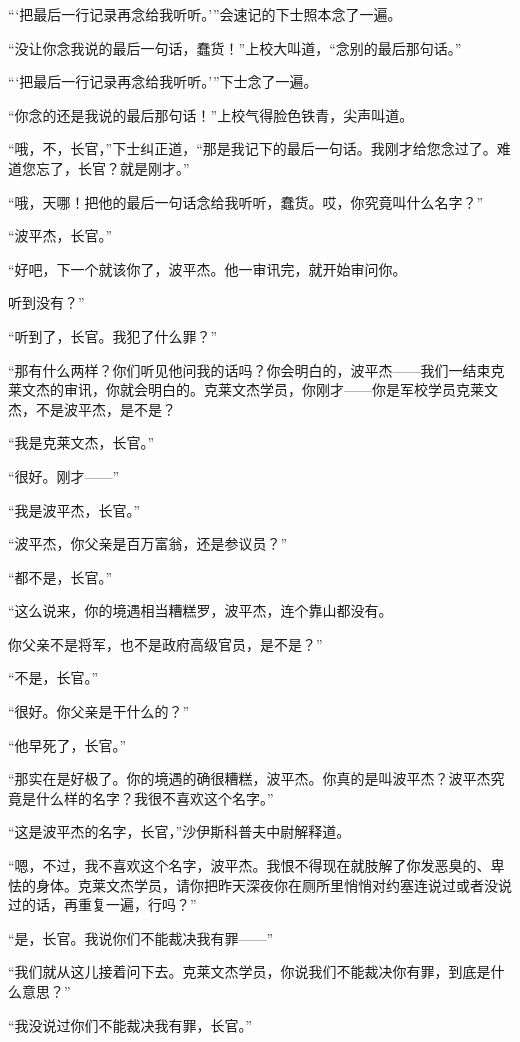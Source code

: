     “‘把最后一行记录再念给我听听。’”会速记的下士照本念了一遍。

    “没让你念我说的最后一句话，蠢货！”上校大叫道，“念别的最后那句话。”

    “‘把最后一行记录再念给我听听。’”下士念了一遍。

    “你念的还是我说的最后那句话！”上校气得脸色铁青，尖声叫道。

    “哦，不，长官，”下士纠正道，“那是我记下的最后一句话。我刚才给您念过了。难道您忘了，长官？就是刚才。”

    “哦，天哪！把他的最后一句话念给我听听，蠢货。哎，你究竟叫什么名字？”

    “波平杰，长官。”

    “好吧，下一个就该你了，波平杰。他一审讯完，就开始审问你。

    听到没有？”

    “听到了，长官。我犯了什么罪？”

    “那有什么两样？你们听见他问我的话吗？你会明白的，波平杰——我们一结束克莱文杰的审讯，你就会明白的。克莱文杰学员，你刚才——你是军校学员克莱文杰，不是波平杰，是不是？

    “我是克莱文杰，长官。”

    “很好。刚才——”

    “我是波平杰，长官。”

    “波平杰，你父亲是百万富翁，还是参议员？”

    “都不是，长官。”

    “这么说来，你的境遇相当糟糕罗，波平杰，连个靠山都没有。

    你父亲不是将军，也不是政府高级官员，是不是？”

    “不是，长官。”

    “很好。你父亲是干什么的？”

    “他早死了，长官。”

    “那实在是好极了。你的境遇的确很糟糕，波平杰。你真的是叫波平杰？波平杰究竟是什么样的名字？我很不喜欢这个名字。”

    “这是波平杰的名字，长官，”沙伊斯科普夫中尉解释道。

    “嗯，不过，我不喜欢这个名字，波平杰。我恨不得现在就肢解了你发恶臭的、卑怯的身体。克莱文杰学员，请你把昨天深夜你在厕所里悄悄对约塞连说过或者没说过的话，再重复一遍，行吗？”

    “是，长官。我说你们不能裁决我有罪——”

    “我们就从这儿接着问下去。克莱文杰学员，你说我们不能裁决你有罪，到底是什么意思？”

    “我没说过你们不能裁决我有罪，长官。”


